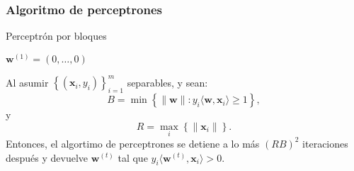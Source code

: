 \documentclass[8pt,a4paper]{extarticle}
\begin{document}
\begin{multicols}{3}
	\subsubsection{Algoritmo de perceptrones}

	\begin{algorithm}[H]
		\caption{Perceptrón por bloques}
		$ \mathbf{w}^{(1)} = (0, \ldots, 0)$\\
	\end{algorithm}

	\begin{boxtheo}[]
		Al asumir $\left\{\left(\mathbf{x}_i, y_i \right)\right\}_{i=1}^m$ separables, y sean:
		$$B = \min \left\{ \| \mathbf{w} \| : y_i \langle \mathbf{w}, \mathbf{x}_i \rangle \ge 1 \right\},$$
		y
		$$\displaystyle R = \max_{i} \left\{ \| \mathbf{x}_i \| \right\}.$$
		Entonces, el algortimo de perceptrones se detiene a lo más $\left( RB \right)^2 $ iteraciones después y devuelve $\mathbf{w}^{(t)}$ tal que $y_i \langle \mathbf{w}^{(t)}, \mathbf{x}_i \rangle > 0$.
	\end{boxtheo}

	\vfill\eject
	\columnbreak
\end{multicols}
\end{document}
